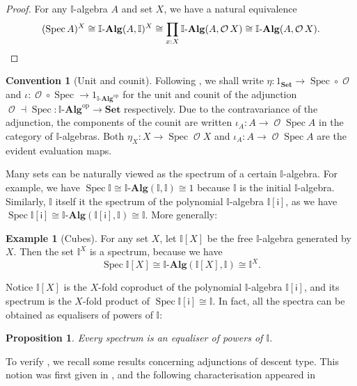\documentclass[a4paper,12pt]{amsart}
\newtheorem{proposition}[theorem]{Proposition}
\theoremstyle{definition}
\newtheorem{convention}[theorem]{Convention}
\newtheorem{example}[theorem]{Example}
\newcommand{\mc}[1]{\mathcal{#1}}
\newcommand{\mb}[1]{\mathbf{#1}}
\newcommand{\mbb}[1]{\mathbb{#1}}
\newcommand{\I}{\mbb I}
\newcommand{\ms}[1]{\mathsf{#1}}
\newcommand{\Set}{\mb{Set}}
\newcommand{\alg}{\text{-}\mb{Alg}}
\newcommand{\op}{^{\mathrm{op}}}
\newcommand{\spec}{\operatorname{Spec}}
\newcommand{\opens}{\operatorname{\mc{O}}} %
\begin{document}
\begin{proof}
  For any $\I$-algebra $A$ and set $X$, we have a natural equivalence 
  \[ (\spec A)^X \cong \I\alg(A,\I)^X \cong \prod_{x:X}\I\alg(A,\opens{X})\cong \I\alg(A,\opens{X})\text{.} \qedhere\]
\end{proof}

\begin{convention}[Unit and counit]
  Following \citet{Taylor2011}, we shall write $\eta\colon 1_{\Set}\to \spec\circ\opens$ and $\iota\colon \opens\circ\spec\to 1_{\I\alg\op}$ for the unit and counit of the adjunction $\opens\dashv \spec\colon \I\alg\op\to \Set$ respectively. Due to the contravariance of the adjunction, the components of the counit are written $\iota_A\colon A\to \opens\spec{A}$ in the category of $\I$-algebras. Both $\eta_X\colon X\to \spec\opens{X}$ and $\iota_A\colon A\to \opens\spec{A}$ are the evident evaluation maps.
\end{convention}

Many sets can be naturally viewed as the spectrum of a certain $\I$-algebra. For example, we have $\spec \I \cong \I\alg(\I,\I) \cong 1$ because  $\I$ is the initial $\I$-algebra. Similarly, $\I$ itself it the spectrum of the polynomial $\I$-algebra $\I[\ms{i}]$, as we have $\spec \I[\ms{i}] \cong \I\alg(\I[\ms{i}],\I) \cong \I$. More generally:

\begin{example}[Cubes]\label{exm:cubeaffine}
  For any set $X$, let $\I[X]$ be the free $\I$-algebra generated by $X$. Then the set $\I^X$ is a spectrum, because we have
  \[ \spec \I[X] \cong \I\alg(\I[X],\I) \cong \I^X\text{.} \]
\end{example}

Notice $\I[X]$ is the $X$-fold coproduct of the polynomial $\I$-algebra $\I[\ms{i}]$, and its spectrum is the $X$-fold product of $\spec\I[\ms{i}] \cong \I$. In fact, all the spectra can be obtained as equalisers of powers of $\I$:

\begin{proposition}\label{prop:spectra-are-powers-of-the-interval}
  Every spectrum is an equaliser of powers of $\I$. 
\end{proposition}

To verify , we recall some results concerning adjunctions of descent type. This notion was first given in \citet{BarrMichael1985Ttat}, and the following characterisation appeared in \citet{kelly1993adjunctions}
\end{document}
